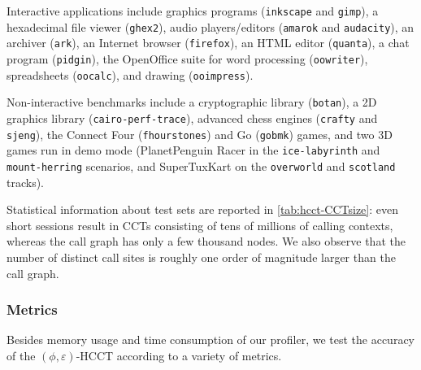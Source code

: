 Interactive applications include graphics programs ({\tt inkscape} and {\tt gimp}), a hexadecimal file viewer ({\tt ghex2}), audio players/editors ({\tt amarok} and {\tt audacity}), an archiver ({\tt ark}), an Internet browser ({\tt firefox}), an HTML editor ({\tt quanta}), a chat program ({\tt pidgin}), the OpenOffice suite for word processing ({\tt oowriter}), spreadsheets ({\tt oocalc}), and drawing ({\tt ooimpress}).

Non-interactive benchmarks include a cryptographic library ({\tt botan}), a 2D graphics library ({\tt cairo-perf-trace}), advanced chess engines ({\tt crafty} and {\tt sjeng}), the Connect Four ({\tt fhourstones}) and Go ({\tt gobmk}) games, and two 3D games run in demo mode (PlanetPenguin Racer in the {\tt ice-labyrinth} and {\tt mount-herring} scenarios, and SuperTuxKart on the {\tt overworld} and {\tt scotland} tracks).

Statistical information about test sets are reported in \mytable\ref{tab:hcct-CCTsize}: even short sessions result in CCTs consisting of tens of millions of calling contexts, whereas the call graph has only a few thousand nodes. We also observe that the number of distinct call sites is roughly one order of magnitude larger than the call graph.

\subsubsection*{Metrics}
Besides memory usage and time consumption of our profiler, we test the accuracy of the $(\phi,\varepsilon)$-HCCT according to a variety of metrics.

